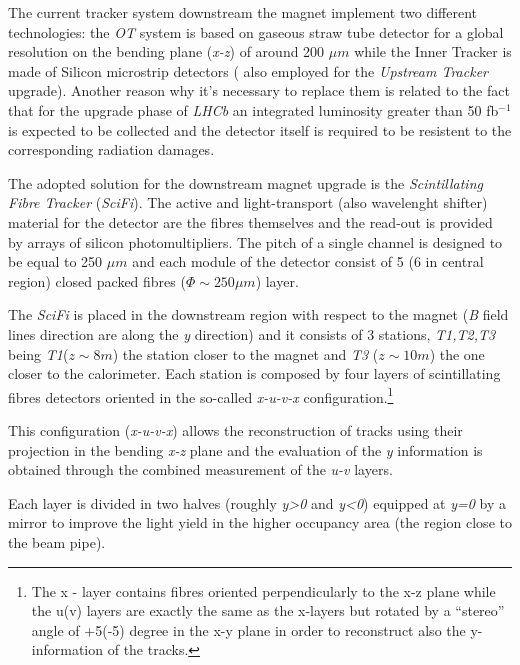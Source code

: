 \documentclass[paper=a4, fontsize=10pt]{scrartcl}
\numberwithin{equation}{section}		%
\numberwithin{figure}{section}			%
\numberwithin{table}{section}				%
\begin{document}
The current tracker system downstream the magnet implement two different technologies: the \textit{OT} system is based on gaseous straw tube detector for a global resolution on the bending plane (\textit{x-z}) of around 200 $\mu m$ while the Inner Tracker is made of Silicon microstrip detectors ( also employed for the \textit{Upstream Tracker} upgrade).
Another reason why it's necessary to replace them is related to the fact that for the upgrade phase of \textit{LHCb} an integrated luminosity greater than 50 fb$^{-1}$ is expected to be collected and the detector itself is required to be resistent to the corresponding radiation damages.

The adopted solution for the downstream magnet upgrade is the \textit{Scintillating Fibre Tracker} (\textit{SciFi}). The active and light-transport (also wavelenght shifter) material for the detector are the fibres themselves and the read-out is provided by arrays of silicon photomultipliers. The pitch of a single channel is designed to be equal to 250 $\mu m$ and each module of the detector consist of 5 (6 in central region) closed packed fibres ($\Phi \sim 250 \mu m$) layer.

 
The \textit{SciFi} is placed in the downstream region with respect to the magnet (\textit{B} field lines direction are along the \textit{y} direction) and it consists of 3 stations, \textit{T1,T2,T3} being \textit{T1}($z\sim 8m$) the station closer to the magnet and \textit{T3} ($z\sim 10m$) the one closer to the calorimeter. Each station is composed by four layers of scintillating fibres detectors oriented in the so-called \textit{x-u-v-x} configuration.\footnote{The x - layer contains fibres oriented perpendicularly to the x-z plane while the u(v) layers are exactly the same as the x-layers but rotated by a ``stereo'' angle of +5(-5) degree in the x-y plane in order to reconstruct also the y-information of the tracks.}

This configuration (\textit{x-u-v-x}) allows the reconstruction of tracks using their projection in the bending \textit{x-z} plane and the evaluation of the \textit{y} information is obtained through the combined measurement of the \textit{u-v} layers. 

Each layer is divided in two halves (roughly \textit{y>0} and \textit{y<0}) equipped at \textit{y=0} by a mirror to improve the light yield in the higher occupancy area (the region close to the beam pipe).
\end{document}
